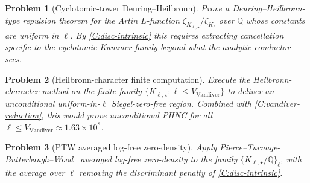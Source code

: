 \documentclass[11pt]{article}
\newtheorem{problem}{Problem}
\newcommand{\Q}{\mathbb Q}
\begin{document}
\begin{problem}[Cyclotomic-tower Deuring--Heilbronn]\label{Pr:DH-cyclotomic-tower}
Prove a Deuring--Heilbronn-type repulsion theorem for the Artin \(L\)-function \(\zeta_{K_{\ell,\star}}/\zeta_{K_\ell}\) over \(\Q\) whose constants are uniform in \(\ell\).  By \cref{C:disc-intrinsic} this requires extracting cancellation specific to the cyclotomic Kummer family beyond what the analytic conductor sees.
\end{problem}

\begin{problem}[Heilbronn-character finite computation]\label{Pr:heilbronn-finite}
Execute the Heilbronn-character method on the finite family \(\{K_{\ell,\star}\colon\ell\le V_{\mathrm{Vandiver}}\}\) to deliver an unconditional uniform-in-\(\ell\) Siegel-zero-free region.  Combined with \cref{C:vandiver-reduction}, this would prove unconditional PHNC for all \(\ell\le V_{\mathrm{Vandiver}}\approx 1.63\times 10^8\).
\end{problem}

\begin{problem}[PTW averaged log-free zero-density]\label{Pr:PTW-averaged}
Apply Pierce--Turnage-Butterbaugh--Wood~\cite{PTW2020} averaged log-free zero-density to the family \(\{K_{\ell,\star}/\Q\}_\ell\), with the average over \(\ell\) removing the discriminant penalty of \cref{C:disc-intrinsic}.
\end{problem}
\end{document}
